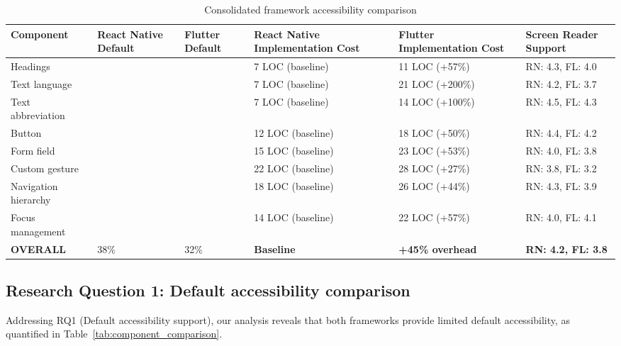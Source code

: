 \begin{table}[ht]
\caption{Consolidated framework accessibility comparison}
\label{tab:consolidated_comparison}
\centering
\begin{tabular}{|C{2.3cm}|C{1.7cm}|C{1.7cm}|C{2.3cm}|C{2.3cm}|C{2.3cm}|}
\hline
\textbf{Component} & \textbf{React Native Default} & \textbf{Flutter Default} & \textbf{React Native Implementation Cost} & \textbf{Flutter Implementation Cost} & \textbf{Screen Reader Support} \\
\hline
Headings &  &  & 7 LOC (baseline) & 11 LOC (+57\%) & RN: 4.3, FL: 4.0 \\
\hline
Text language &  &  & 7 LOC (baseline) & 21 LOC (+200\%) & RN: 4.2, FL: 3.7 \\
\hline
Text abbreviation &  &  & 7 LOC (baseline) & 14 LOC (+100\%) & RN: 4.5, FL: 4.3 \\
\hline
Button &  &  & 12 LOC (baseline) & 18 LOC (+50\%) & RN: 4.4, FL: 4.2 \\
\hline
Form field &  &  & 15 LOC (baseline) & 23 LOC (+53\%) & RN: 4.0, FL: 3.8 \\
\hline
Custom gesture &  &  & 22 LOC (baseline) & 28 LOC (+27\%) & RN: 3.8, FL: 3.2 \\
\hline
Navigation hierarchy &  &  & 18 LOC (baseline) & 26 LOC (+44\%) & RN: 4.3, FL: 3.9 \\
\hline
Focus management &  &  & 14 LOC (baseline) & 22 LOC (+57\%) & RN: 4.0, FL: 4.1 \\
\hline
\textbf{OVERALL} & 38\% & 32\% & \textbf{Baseline} & \textbf{+45\% overhead} & \textbf{RN: 4.2, FL: 3.8} \\
\hline
\end{tabular}
\end{table}

\FloatBarrier

\subsection{Research Question 1: Default accessibility comparison}
\label{subsec:default-accessibility}

Addressing RQ1 (Default accessibility support), our analysis reveals that both frameworks provide limited default accessibility, as quantified in Table~\ref{tab:component_comparison}.

